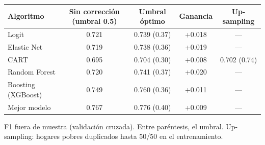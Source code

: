 
\begin{threeparttable}
\begin{tabular}[t]{lcccc}
\toprule
Algoritmo & Sin corrección (umbral 0.5) & Umbral óptimo & Ganancia & Up-sampling\\
\midrule
Logit & 0.721 & 0.739 (0.37) & +0.018 & ---\\
Elastic Net & 0.719 & 0.738 (0.36) & +0.019 & ---\\
CART & 0.695 & 0.704 (0.30) & +0.008 & 0.702 (0.74)\\
Random Forest & 0.720 & 0.741 (0.37) & +0.020 & ---\\
Boosting (XGBoost) & 0.749 & 0.760 (0.36) & +0.011 & ---\\
\midrule
Mejor modelo & 0.767 & 0.776 (0.40) & +0.009 & ---\\
\bottomrule
\end{tabular}
\begin{tablenotes}
\item F1 fuera de muestra (validación cruzada). Entre paréntesis, el umbral. Up-sampling: hogares pobres duplicados hasta 50/50 en el entrenamiento.
\end{tablenotes}
\end{threeparttable}
